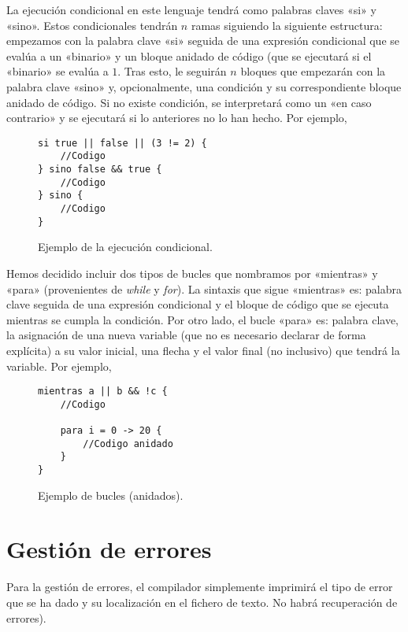 La ejecución condicional en este lenguaje tendrá como palabras claves «si» y
«sino». Estos condicionales tendrán $n$ ramas siguiendo la siguiente estructura:
empezamos con la palabra clave «si» seguida de una expresión condicional que se
evalúa a un «binario» y un bloque anidado de código (que se ejecutará si el
«binario» se evalúa a $1$. Tras esto, le seguirán $n$ bloques que empezarán con
la palabra clave «sino» y, opcionalmente, una condición y su correspondiente
bloque anidado de código. Si no existe condición, se interpretará como un «en
caso contrario» y se ejecutará si lo anteriores no lo han hecho. Por ejemplo,
\begin{figure}[H]
    \centering
    \begin{lstlisting}
si true || false || (3 != 2) {
    //Codigo
} sino false && true {
    //Codigo
} sino {
    //Codigo
}
    \end{lstlisting}
    \caption{Ejemplo de la ejecución condicional.}
\end{figure}

Hemos decidido incluir dos tipos de bucles que nombramos por «mientras» y «para»
(provenientes de \textit{while} y \textit{for}). La sintaxis que sigue
«mientras» es: palabra clave seguida de una expresión condicional y el bloque de
código que se ejecuta mientras se cumpla la condición. Por otro lado, el bucle
«para» es: palabra clave, la asignación de una nueva variable (que no es
necesario declarar de forma explícita) a su valor inicial, una flecha y el valor
final (no inclusivo) que tendrá la variable. Por ejemplo,
\begin{figure}[H]
    \centering
    \begin{lstlisting}
mientras a || b && !c {
    //Codigo

    para i = 0 -> 20 {
        //Codigo anidado
    }
}
    \end{lstlisting}
    \caption{Ejemplo de bucles (anidados).}
\end{figure}

\section*{Gestión de errores}
Para la gestión de errores, el compilador simplemente imprimirá el tipo de error
que se ha dado y su localización en el fichero de texto. No habrá recuperación
de errores).

